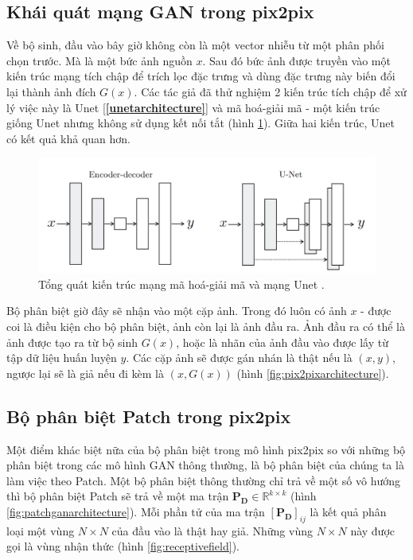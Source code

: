 \documentclass[a4paper, 12pt]{report}
\begin{document}
\subsection{Khái quát mạng GAN trong pix2pix}\label{overviewofpix2pix}

Về bộ sinh, đầu vào bây giờ không còn là một vector nhiễu từ một phân phối chọn trước.
Mà là một bức ảnh nguồn $x$.
Sau đó bức ảnh được truyền vào một kiến trúc mạng tích chập để trích lọc đặc trưng và dùng đặc trưng này biến đổi lại thành ảnh đích $G(x)$.
Các tác giả đã thử nghiệm 2 kiến trúc tích chập để xử lý việc này là Unet [\textbf{\ref{unetarchitecture}}] và mã hoá-giải mã - một kiến trúc giống Unet nhưng không sử dụng kết nối tắt (hình \ref{fig:enc-decvsunet}).
Giữa hai kiến trúc, Unet có kết quả khả quan hơn.\vspace{5pt}

\begin{figure}[!h]
\captionsetup{width=0.8\textwidth}
\centering
\includegraphics[width=15cm]{images/3_2.PNG}
\caption{Tổng quát kiến trúc mạng mã hoá-giải mã và mạng Unet \cite{isola2018imagetoimage}.}
\label{fig:enc-decvsunet}
\end{figure}

Bộ phân biệt giờ đây sẽ nhận vào một cặp ảnh.
Trong đó luôn có ảnh $x$ - được coi là điều kiện cho bộ phân biệt, ảnh còn lại là ảnh đầu ra.
Ảnh đầu ra có thể là ảnh được tạo ra từ bộ sinh $G(x)$, hoặc là nhãn của ảnh đầu vào được lấy từ tập dữ liệu huấn luyện $y$.
Các cặp ảnh sẽ được gán nhán là thật nếu là $(x, y)$, ngược lại sẽ là giả nếu đi kèm là $\left(x, G(x)\right)$ (hình \ref{fig:pix2pixarchitecture}).

\subsection{Bộ phân biệt Patch trong pix2pix}\label{patchdiscriminator}

Một điểm khác biệt nữa của bộ phân biệt trong mô hình pix2pix so với những bộ phân biệt trong các mô hình GAN thông thường, là bộ phân biệt của chúng ta là làm việc theo Patch.
Một bộ phân biệt thông thường chỉ trả về một số vô hướng thì bộ phân biệt Patch sẽ trả về một ma trận $\mathbf{P_D} \in \mathbb{R}^{k\times k}$ (hình \ref{fig:patchganarchitecture}).
Mỗi phần tử của ma trận $\left[\mathbf{P_D}\right]_{ij}$ là kết quả phân loại một vùng $N \times N$ của đầu vào là thật hay giả.
Những vùng $N \times N$ này được gọi là vùng nhận thức (hình \ref{fig:receptivefield}).\vspace{5pt}
\end{document}
